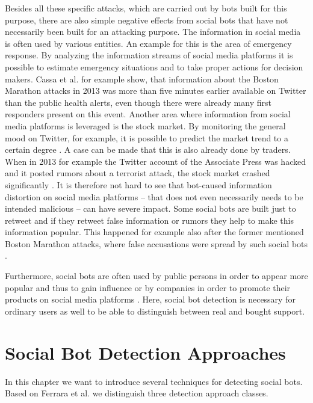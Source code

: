 Besides all these specific attacks, which are carried out by bots built for this purpose, there are also simple negative effects from social bots that have not necessarily been built for an attacking purpose.
The information in social media is often used by various entities. An example for this is the area of emergency response. By analyzing the information streams of social media platforms it is possible to estimate emergency situations and to take proper actions for decision makers. Cassa et al. \cite{cassa} for example show, that information about the Boston Marathon attacks in 2013 was more than five minutes earlier available on Twitter than the public health alerts, even though there were already many first responders present on this event.  Another area where information from social media platforms is leveraged is the stock market. By monitoring the general mood on Twitter, for example, it is possible to predict the market trend to a certain degree \cite{bollen}. A case can be made that this is also already done by traders. When in 2013 for example the Twitter account of the Associate Press was hacked and it posted rumors about a terrorist attack, the stock market crashed significantly \cite{ferrara15}. It is therefore not hard to see that bot-caused information distortion on social media platforms -- that does not even necessarily needs to be intended malicious -- can have severe impact. Some social bots are built just to retweet and if they retweet false information or rumors they help to make this information popular. This happened for example also after the former mentioned Boston Marathon attacks, where false accusations were spread by such social bots \cite{gupta}. 

Furthermore, social bots are often used by public persons in order to appear more popular and thus to gain influence or by companies in order to promote their products on social media platforms \cite{stringhini}. Here, social bot detection is necessary for ordinary users as well to be able to distinguish between real and bought support.





\section{Social Bot Detection Approaches}
In this chapter we want to introduce several techniques for detecting social bots. Based on Ferrara et al. \cite{ferrara15} we distinguish three detection approach classes. 


